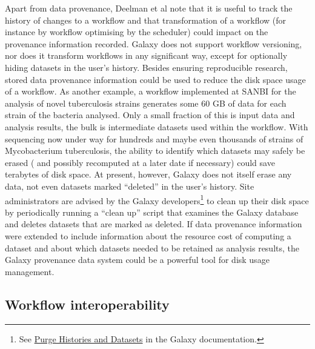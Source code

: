 \documentclass[a4paper,10pt]{scrreprt}
\begin{document}
Apart from data provenance, Deelman et al note that it is useful to track the history of changes to a workflow and that transformation of a workflow (for instance by workflow optimising by the scheduler) could impact on the provenance information recorded. Galaxy does not support workflow versioning, nor does it transform workflows in any significant way, except for optionally hiding datasets in the user's history. Besides ensuring reproducible research, stored data provenance information could be used to reduce the disk space usage of a workflow. As another example, a workflow implemented at SANBI for the analysis of novel tuberculosis strains generates some 60 GB of data for each strain of the bacteria analysed. Only a small fraction of this is input data and analysis results, the bulk is intermediate datasets used within the workflow. With sequencing now under way for hundreds and maybe even thousands of strains of Mycobacterium tuberculosis, the ability to identify which datasets may safely be erased (
and possibly recomputed at a later date if necessary) could save terabytes of disk space. At present, however, Galaxy does not itself erase any data, not even datasets marked ``deleted'' in the user's history. Site administrators are advised by the Galaxy developers\footnote{See \href{http://wiki.g2.bx.psu.edu/Admin/Config/Performance/Purge\%20Histories\%20and\%20Datasets}{Purge Histories and Datasets} in the Galaxy documentation.} to clean up their disk space by periodically running a ``clean up'' script that examines the Galaxy database and deletes datasets that are marked as deleted. If data provenance information were extended to include information about the resource cost of computing a dataset and about which datasets needed to be retained as analysis results, the Galaxy provenance data system could be a powerful tool for disk usage management.

\subsection{Workflow interoperability}
\end{document}
